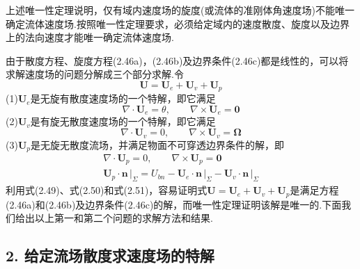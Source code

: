 上述唯一性定理说明，仅有域内速度场的旋度(或流体的准刚体角速度场)不能唯一确定流体速度场.按照唯一性定理要求，必须给定域内的速度散度、旋度以及边界上的法向速度才能唯一确定流体速度场.

由于散度方程、旋度方程(2.46a)，(2.46b)及边界条件(2.46c)都是线性的，可以将求解速度场的问题分解成三个部分求解.令
\begin{equation*}
\boldsymbol{U}=\boldsymbol{U}_e+\boldsymbol{U}_v+\boldsymbol{U}_p
\tag{2.48}
\end{equation*}
(1)$\boldsymbol{U}_e$是无旋有散度速度场的一个特解，即它满足
\begin{equation*}
\nabla\cdot\boldsymbol{U}_e=\theta,\qquad \nabla\times\boldsymbol{U}_e=\boldsymbol{0}
\tag{2.49}
\end{equation*}
(2)$\boldsymbol{U}_v$是有旋无散度速度场的一个特解，即它满足
\begin{equation*}
\nabla\cdot\boldsymbol{U}_v=0,\qquad \nabla\times\boldsymbol{U}_v=\boldsymbol{\Omega}
\tag{2.50}
\end{equation*}
(3)$\boldsymbol{U}_p$是无旋无散度流场，并满足物面不可穿透边界条件的解，即
\begin{gather*}
\nabla\cdot\boldsymbol{U}_p=0,\qquad \nabla\times\boldsymbol{U}_p=\boldsymbol{0}\tag{2.51a}\\[2pt]
\boldsymbol{U}_p\cdot\boldsymbol{n}\,\big|_{\Sigma}=U_{bn}-\boldsymbol{U}_e\cdot\boldsymbol{n}\,\big|_{\Sigma}-\boldsymbol{U}_v\cdot\boldsymbol{n}\,\big|_{\Sigma}\tag{2.51b}
\end{gather*}
利用式(2.49)、式(2.50)和式(2.51)，容易证明式$\boldsymbol{U}=\boldsymbol{U}_e+\boldsymbol{U}_v+\boldsymbol{U}_p$是满足方程(2.46a)和(2.46b)及边界条件(2.46c)的解，而唯一性定理证明该解是唯一的.下面我们给出以上第一和第二个问题的求解方法和结果.

\subsection*{2. 给定流场散度求速度场的特解}

